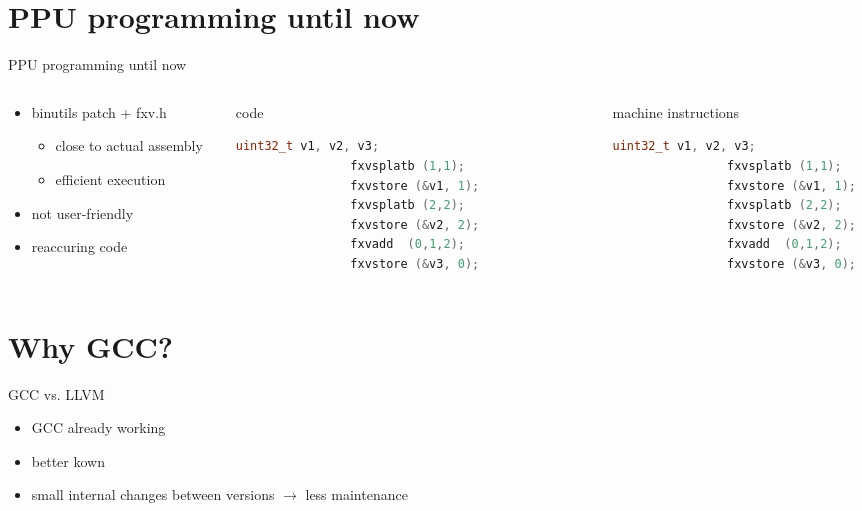 \documentclass[10pt]{beamer}
\begin{document}
\section{PPU programming until now}
\begin{frame}[fragile]{PPU programming until now}
	\begin{columns}[t]
		\begin{column}{0.35\textwidth}
    		\begin{itemize}
				\item binutils patch + fxv.h
					\begin{itemize}
						\item close to actual assembly
						\item efficient execution
					\end{itemize}
				\item not user-friendly
				\item reaccuring code
			\end{itemize}    
    	\end{column}    
    	\begin{column}{0.25\textwidth}
     		\begin{block}{code}
        		\begin{lstlisting}[language=C++,basicstyle=\ttfamily\scriptsize,keywordstyle=\color{red}]
				uint32_t v1, v2, v3;
				fxvsplatb (1,1);
				fxvstore (&v1, 1);
				fxvsplatb (2,2);
				fxvstore (&v2, 2);
				fxvadd 	(0,1,2);
				fxvstore (&v3, 0);				
				\end{lstlisting}
      		\end{block}
    	\end{column}
    	\begin{column}{0.30\textwidth}
    		\begin{block}{machine instructions}
       			\begin{lstlisting}[language=C++,basicstyle=\ttfamily\scriptsize,keywordstyle=\color{red}]
				uint32_t v1, v2, v3;
				fxvsplatb (1,1);
				fxvstore (&v1, 1);
				fxvsplatb (2,2);
				fxvstore (&v2, 2);
				fxvadd 	(0,1,2);
				fxvstore (&v3, 0);
				\end{lstlisting}
      		\end{block}
		\end{column}
	\end{columns}
\end{frame}

\section{Why GCC?}
\begin{frame}{GCC vs. LLVM}
	\begin{itemize}
		\item GCC already working
		\item better kown
		\item small internal changes between versions $\rightarrow$ less maintenance
	\end{itemize}
\end{frame}
\end{document}
